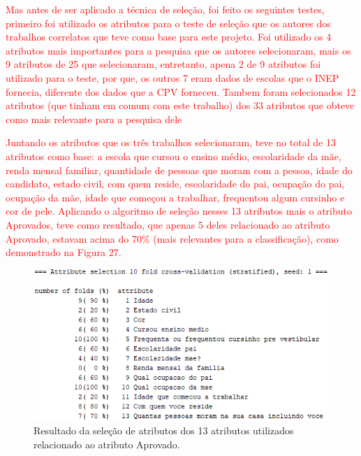 \par
\textcolor{red}{}



\par
\textcolor{red}{Mas antes de ser aplicado a técnica de seleção, foi feito os seguintes testes, primeiro foi utilizado os atributos para o teste de seleção que os autores dos trabalhos correlatos que teve como base para este projeto. Foi utilizado os 4 atributos mais importantes para a pesquisa que os autores  selecionaram, mais os 9 atributos de 25 que  selecionaram, entretanto, apena 2 de 9 atributos foi utilizado para o teste, por que, os outros 7 eram dados de escolas que o INEP fornecia, diferente dos dados que a CPV forneceu. Tambem foram selecionados 12 atributos (que tinham em comum com este trabalho) dos 33 atributos que  obteve como mais relevante para a pesquisa dele}


\par
\textcolor{red}{Juntando os atributos que os três trabalhos selecionaram, teve no total de 13 atributos como base: a escola que cursou o ensino médio, escolaridade da mãe, renda mensal familiar, quantidade de pessoas que moram com a pessoa, idade do candidato, estado civil, com quem reside, escolaridade do pai, ocupação do pai, ocupação da mãe, idade que começou a trabalhar, frequentou algum cursinho e cor de pele. Aplicando o algoritmo de seleção nesses 13 atributos mais o atributo Aprovados, teve como resultado, que apenas 5 deles relacionado ao atributo Aprovado, estavam acima do 70\%  (mais relevantes para a classificação), como demonstrado na Figura 27.}

\par
\begin{figure}[!htp]
	\begin{center}
    \caption{\label{fig:waveform_fig} Resultado da seleção de atributos dos 13 atributos utilizados relacionado ao atributo Aprovado.}
	\includegraphics[scale=0.99]{Figuras/13_atributos.png}
	\end{center}
\end{figure}

